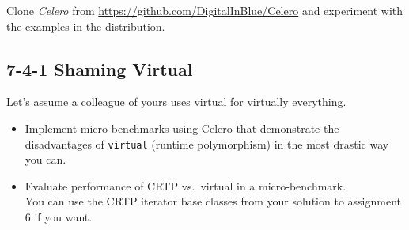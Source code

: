 \documentclass[]{article}
\begin{document}
Clone \emph{Celero} from \url{https://github.com/DigitalInBlue/Celero}
and experiment with the examples in the distribution.

\subsection{7-4-1 Shaming Virtual}\label{shaming-virtual}

Let's assume a colleague of yours uses virtual for virtually everything.

\begin{itemize}
\item
  Implement micro-benchmarks using Celero that demonstrate the
  disadvantages of \texttt{virtual} (runtime polymorphism) in the most
  drastic way you can.
\item
  Evaluate performance of CRTP vs.~virtual in a micro-benchmark.\\
   You can use the CRTP iterator base classes from your solution to
  assignment 6 if you want.
\end{itemize}
\end{document}
